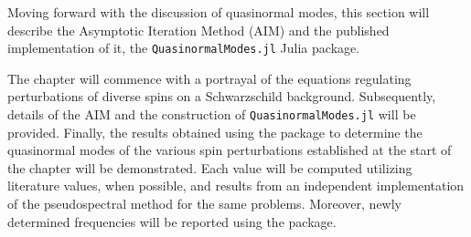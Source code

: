Moving forward with the discussion of quasinormal modes, this section will describe the Asymptotic Iteration Method (\ac{AIM}) and the published implementation of it, the \texttt{QuasinormalModes.jl} Julia package.

The chapter will commence with a portrayal of the equations regulating perturbations of diverse spins on a Schwarzschild background. Subsequently, details of the \ac{AIM} and the construction of \texttt{QuasinormalModes.jl} will be provided. Finally, the results obtained using the package to determine the quasinormal modes of the various spin perturbations established at the start of the chapter will be demonstrated. Each value will be computed utilizing literature values, when possible, and results from an independent implementation of the pseudospectral method for the same problems. Moreover, newly determined frequencies will be reported using the package.